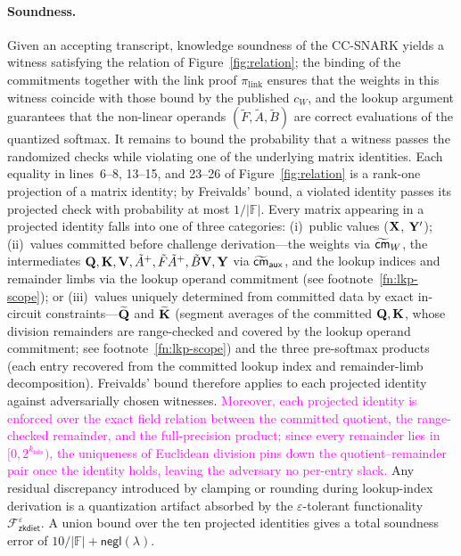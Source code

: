 \documentclass[sigconf,anonymous,review,balance=false]{acmart}
\newcommand{\rev}[1]{{\color{magenta}#1}}
\begin{document}
{\paragraph{Soundness.}
Given an accepting transcript, knowledge soundness of the CC-SNARK yields
a witness satisfying the relation of Figure~\ref{fig:relation}; the
binding of the commitments together with the link proof $\pi_{\mathrm{link}}$
ensures that the weights in this witness coincide with those bound by the
published $c_W$, and the lookup argument guarantees that the non-linear
operands $(\tilde{F},\tilde{A},\tilde{B})$ are correct evaluations of the
quantized softmax. It remains to bound the probability that a witness
passes the randomized checks while violating one of the underlying matrix
identities. Each equality in lines~6--8, 13--15, and 23--26 of
Figure~\ref{fig:relation} is a rank-one projection of a matrix identity;
by Freivalds' bound, a violated identity passes its projected check with
probability at most $1/|\mathbb{F}|$. Every matrix appearing in a projected identity falls into one of three categories: (i)~public values (${\mathbf{X}}$, ${\mathbf{Y}}'$); (ii)~values committed before challenge derivation---the weights via $\widetilde{{\sf cm}}_{W}$, the intermediates ${\mathbf{Q}}, {\mathbf{K}}, {\mathbf{V}}, \tilde{A}^{+}, \tilde{F}\tilde{A}^{+}, \tilde{B}{\mathbf{V}}, {\mathbf{Y}}$ via $\widetilde{{\sf cm}}_{\mathsf{aux}}$, and the lookup indices and remainder limbs via the lookup operand commitment (see footnote~\ref{fn:lkp-scope}); or (iii)~values uniquely determined from committed data by exact in-circuit constraints---$\widetilde{{\mathbf{Q}}}$ and $\widetilde{{\mathbf{K}}}$ (segment averages of the committed ${\mathbf{Q}}, {\mathbf{K}}$\rev{, whose division remainders are range-checked and covered by the lookup operand commitment; see footnote~\ref{fn:lkp-scope}}) and the three pre-softmax products (each entry recovered from the committed lookup index and remainder-limb decomposition). Freivalds' bound therefore applies to each projected identity against adversarially chosen witnesses. \textcolor{magenta}{Moreover, each projected identity is enforced over the exact field relation between the committed quotient, the range-checked remainder, and the full-precision product; since every remainder lies in $[0, 2^{k_{\text{bits}}})$, the uniqueness of Euclidean division pins down the quotient--remainder pair once the identity holds, leaving the adversary no per-entry slack.} Any residual discrepancy introduced by clamping or rounding during lookup-index derivation is a quantization artifact absorbed by the $\varepsilon$-tolerant functionality $\mathcal{F}^{\varepsilon}_{\mathsf{zkdiet}}$. A union bound over the ten projected identities gives a total soundness error of $10/|\mathbb{F}| + \mathsf{negl}(\lambda)$.

}
\end{document}
